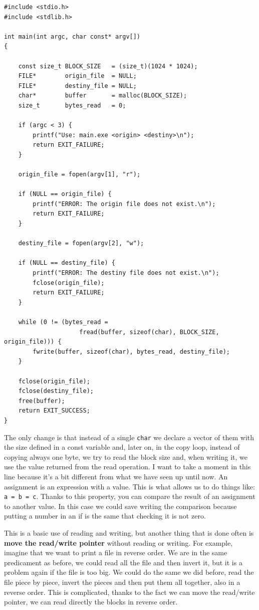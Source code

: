 \documentclass[a4paper]{article}
\begin{document}
\noindent
\begin{minipage}[H]{\linewidth}
\mbox{}
\begin{lstlisting}[style=C,
caption={Example of file copying with a buffer},
label={lst:readWithBuffer}]
#include <stdio.h>
#include <stdlib.h>

int main(int argc, char const* argv[])
{

    const size_t BLOCK_SIZE   = (size_t)(1024 * 1024);
    FILE*        origin_file  = NULL;
    FILE*        destiny_file = NULL;
    char*        buffer       = malloc(BLOCK_SIZE);
    size_t       bytes_read   = 0;

    if (argc < 3) {
        printf("Use: main.exe <origin> <destiny>\n");
        return EXIT_FAILURE;
    }

    origin_file = fopen(argv[1], "r");

    if (NULL == origin_file) {
        printf("ERROR: The origin file does not exist.\n");
        return EXIT_FAILURE;
    }

    destiny_file = fopen(argv[2], "w");

    if (NULL == destiny_file) {
        printf("ERROR: The destiny file does not exist.\n");
        fclose(origin_file);
        return EXIT_FAILURE;
    }

    while (0 != (bytes_read =
                     fread(buffer, sizeof(char), BLOCK_SIZE, origin_file))) {
        fwrite(buffer, sizeof(char), bytes_read, destiny_file);
    }

    fclose(origin_file);
    fclose(destiny_file);
    free(buffer);
    return EXIT_SUCCESS;
}
\end{lstlisting}
\end{minipage}

The only change is that instead of a single \verb!char! we declare a vector of
them with the size defined in a const variable and, later on, in the copy loop,
instead of copying always one byte, we try to read the block size and, when
writing it, we use the value returned from the read operation. I want to take a
moment in this line because it's a bit different from what we have seen up until
now. An assignment is an expression with a value. This is what allows us to do
things like: \verb!a = b = c!. Thanks to this property, you can compare the
result of an assignment to another value. In this case we could save writing the
comparison because putting a number in an if is the same that checking it is not
zero.

This is a basic use of reading and writing, but another thing that is done often
is \textbf{move the read/write pointer} without reading or writing. For example,
imagine that we want to print a file in reverse order. We are in the same
predicament as before, we could read all the file and then invert it, but it is
a problem again if the file is too big. We could do the same we did before, read
the file piece by piece, invert the pieces and then put them all together, also
in a reverse order. This is complicated, thanks to the fact we can move the
read/write pointer, we can read directly the blocks in reverse order.
\end{document}
